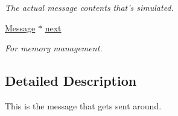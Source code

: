 \begin{DoxyCompactItemize}
\begin{tabbing}
\end{tabbing}\begin{DoxyCompactList}\small\item\em The actual message contents that's simulated. \end{DoxyCompactList}\item 
\hyperlink{union_simulator_1_1_c_d_m_a_1_1_node_1_1_message}{Message} $\ast$ \hyperlink{union_simulator_1_1_c_d_m_a_1_1_node_1_1_message_a9cc157f9a6cef35bacc0d630c333d18f}{next}
\begin{DoxyCompactList}\small\item\em For memory management. \end{DoxyCompactList}\end{DoxyCompactItemize}


\subsection{Detailed Description}
This is the message that gets sent around. 

